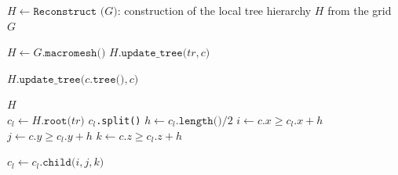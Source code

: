 \begin{algorithm}[htbp]
\caption{$H \gets \texttt{Reconstruct (}G\texttt{)}$: construction of the local tree hierarchy $H$ from the grid $G$}
\begin{algorithmic}[1]
\State $H \gets G.\texttt{macromesh()}$
 
		\State $H.\texttt{update\_tree(} tr, c \texttt{)}$
	\EndFor
\EndFor

 
	\State $H.\texttt{update\_tree(} c.\texttt{tree()}, c \texttt{)}$
\EndFor

\State \Return $H$
\\
   
	\State $c_l \gets H.\texttt{root(}tr\texttt{)}$
		 $c_l$\texttt{.split()}
		\EndIf
		\State $h \gets c_l.\texttt{length()} / 2$ 
		\State $i \gets c.x \ge c_l.x + h$
		\State $j \gets c.y \ge c_l.y + h$
		\State $k \gets c.z \ge c_l.z + h$

		\State $c_l \gets c_l.\texttt{child(} i, j, k \texttt{)}$
	\EndWhile	
\EndFunction
\end{algorithmic}
\label{alg:reconstruction}
\end{algorithm}

